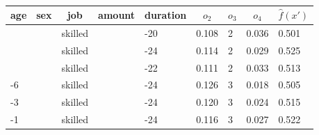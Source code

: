 \begin{table}[]
\caption{}
\centering
\label{tab:german-credit2}
\begin{tabular}{|l|l|l|l|l|l|l|l|l|}
\hline
\multicolumn{1}{|c|}{\textbf{age}} & \multicolumn{1}{c|}{\textbf{sex}} & \multicolumn{1}{c|}{\textbf{job}} & \multicolumn{1}{c|}{\textbf{amount}} & \multicolumn{1}{c|}{\textbf{duration}} & \multicolumn{1}{c|}{\textbf{$o_2$}} & \multicolumn{1}{c|}{\textbf{$o_3$}} & \multicolumn{1}{c|}{\textbf{$o_4$}} & \multicolumn{1}{c|}{\textbf{$\hat{f}(x')$}} \\ \hline
                                   &                                   & skilled                           &                                      & -20                                    & 0.108                          & 2                              & 0.036                          & 0.501                          \\ \hline
                                   &                                   & skilled                           &                                      & -24                                    & 0.114                          & 2                              & 0.029                          & 0.525                          \\ \hline
                                   &                                   & skilled                           &                                      & -22                                    & 0.111                          & 2                              & 0.033                          & 0.513                          \\ \hline
-6                                 &                                   & skilled                           &                                      & -24                                    & 0.126                          & 3                              & 0.018                          & 0.505                          \\ \hline
-3                                 &                                   & skilled                           &                                      & -24                                    & 0.120                          & 3                              & 0.024                          & 0.515                          \\ \hline
-1                                 &                                   & skilled                           &                                      & -24                                    & 0.116                          & 3                              & 0.027                          & 0.522                          \\ \hline

\end{tabular}
\end{table}

